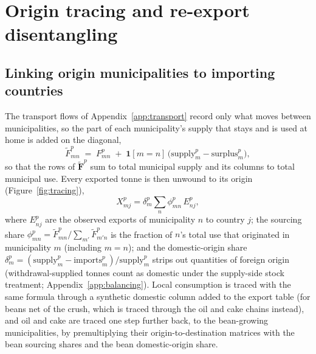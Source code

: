 \section{Origin tracing and re-export disentangling}\label{app:tracing}

\subsection{Linking origin municipalities to importing countries}\label{subsubsec:exportlink}
The transport flows of Appendix~\ref{app:transport} record only what
moves between municipalities, so the part of each municipality's supply
that stays and is used at home is added on the diagonal,
\begin{equation}\label{eq:augment}
  \tilde F^p_{mn} \;=\; F^p_{mn} \;+\;
  \mathbf{1}[m=n]\,\big(\text{supply}^p_m-\text{surplus}^p_m\big),
\end{equation}
so that the rows of $\tilde{\mathbf{F}}^p$ sum to total municipal supply
and its columns to total municipal use. Every exported tonne is then
unwound to its origin (Figure~\ref{fig:tracing}),
\begin{equation}\label{eq:src2exp}
  X^p_{mj}=\delta^p_m\sum_{n}\phi^p_{mn}\,E^p_{nj},
\end{equation}
where $E^p_{nj}$ are the observed exports of municipality $n$ to country
$j$; the sourcing share
$\phi^p_{mn}=\tilde F^p_{mn}/\sum_{m'}\tilde F^p_{m'n}$ is the fraction
of $n$'s total use that originated in municipality $m$ (including $m=n$);
and the domestic-origin share
$\delta^p_m=(\text{supply}^p_m-\text{imports}^p_m)/\text{supply}^p_m$
strips out quantities of foreign origin (withdrawal-supplied tonnes count as
domestic under the supply-side stock treatment;
Appendix~\ref{app:balancing}).
Local consumption is traced with the same formula through a synthetic
domestic column added to the export table (for beans net of the crush, which
is traced through the oil and cake chains instead), and oil and cake are
traced one step further back, to the bean-growing municipalities, by
premultiplying their origin-to-destination matrices with the bean sourcing
shares and the bean domestic-origin share.

